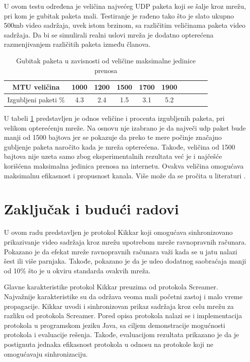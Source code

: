 \documentclass[12pt,oneside]{memoir}
\begin{document}
U ovom testu određena je veličina najvećeg UDP paketa koji se šalje kroz mrežu, pri kom je gubitak paketa mali. Testiranje je rađeno tako što je slato ukupno 500mb video sadržaja, uvek istom brzinom, sa različitim veličinama paketa video sadržaja. Da bi se simulirali realni uslovi mreža je dodatno opterećena razmenjivanjem različitih paketa između članova. 

\begin{table}[h]
\caption{Gubitak paketa u zavisnosti od veličine maksimalne jedinice prenosa} 
\label{tab:mtu}
\centering
\begin{tabular}{ |c|c|c|c|c|c|c|c|c|c| } 
\hline 
 MTU veličina & 1000 & 1200 & 1500 & 1700 & 1900\\
\hline
 Izgubljeni paketi \% & 4.3 & 2.4 & 1.5 & 3.1 & 5.2  \\
\hline
\end{tabular}
\end{table} 

U tabeli \ref{tab:mtu} predstavljen je odnos veličine i procenta izgubljenih paketa, pri velikom opterećenju mreže. Na osnovu nje izabrano je da največi udp paket bude manji od 1500 bajtova jer se pokazuje da preko te mere počinje značajno gubljenje paketa naročito kada je mreža opterećena. Takođe, veličina od 1500 bajtova nije uzeta samo zbog eksperimentalnih rezultata već je i najčešće korišćena maksimalna jedinica prenosa na internetu. Ovakva veličina omogućava maksimalnu efikasnost i propusnost kanala. Više može da se pročita u literaturi \cite{Kodikara} .




\chapter{Zaključak i budući radovi}
\label{chp:zakljucak}

U ovom radu predstavljen je protokol Kikkar koji omogućava sinhronizovano prikazivanje video sadržaja kroz mrežu upotrebom mreže ravnopravnih računara. Pokazano je da efekat mreže ravnopravnih računara važi kada se u jatu nalazi šest ili više parnjaka. Takođe, pokazano je da je udeo dodatnog saobraćaja manji od 10\% što je u okviru standarda ovakvih mreža.
 
Glavne karakteristike protokol Kikkar preuzima od protokola Screamer. Najvažnije karakteristike su da održava veoma mali početni zastoj i malo vreme propagacije. Kikkar uvodi i sinhronizovan prikaz sadržaja kroz celu mrežu za razliku od protokola Screamer. Pored opisa protokola nalazi se i implementacija protokola u programskom jeziku Java, sa ciljem demonstracije mogućnosti protokola i evaluacije rešenja. Takođe, evaluacijom rezultata prikazano je da je postignuta jednaka efikasnost protokola u odnosu na protokole koji ne omogućavaju sinhronizaciju. 
\end{document}
